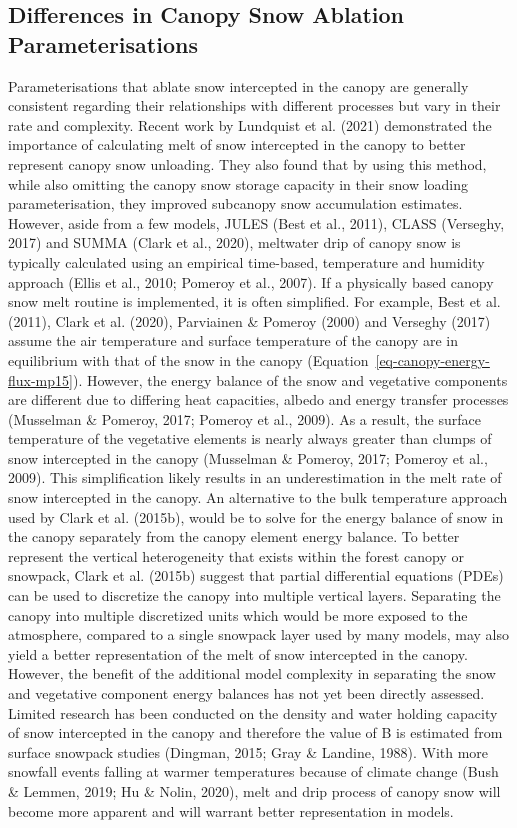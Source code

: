 \documentclass[
  letterpaper,
]{tex/uofsthesis-cs}
\begin{document}
\subsection{Differences in Canopy Snow Ablation
Parameterisations}\label{differences-in-canopy-snow-ablation-parameterisations}

Parameterisations that ablate snow intercepted in the canopy are
generally consistent regarding their relationships with different
processes but vary in their rate and complexity. Recent work by
Lundquist et al. (2021) demonstrated the importance of calculating melt
of snow intercepted in the canopy to better represent canopy snow
unloading. They also found that by using this method, while also
omitting the canopy snow storage capacity in their snow loading
parameterisation, they improved subcanopy snow accumulation estimates.
However, aside from a few models, JULES (Best et al., 2011), CLASS
(Verseghy, 2017) and SUMMA (Clark et al., 2020), meltwater drip of
canopy snow is typically calculated using an empirical time-based,
temperature and humidity approach (Ellis et al., 2010; Pomeroy et al.,
2007). If a physically based canopy snow melt routine is implemented, it
is often simplified. For example, Best et al. (2011), Clark et al.
(2020), Parviainen \& Pomeroy (2000) and Verseghy (2017) assume the air
temperature and surface temperature of the canopy are in equilibrium
with that of the snow in the canopy
(Equation~\ref{eq-canopy-energy-flux-mp15}). However, the energy balance
of the snow and vegetative components are different due to differing
heat capacities, albedo and energy transfer processes (Musselman \&
Pomeroy, 2017; Pomeroy et al., 2009). As a result, the surface
temperature of the vegetative elements is nearly always greater than
clumps of snow intercepted in the canopy (Musselman \& Pomeroy, 2017;
Pomeroy et al., 2009). This simplification likely results in an
underestimation in the melt rate of snow intercepted in the canopy. An
alternative to the bulk temperature approach used by Clark et al.
(2015b), would be to solve for the energy balance of snow in the canopy
separately from the canopy element energy balance. To better represent
the vertical heterogeneity that exists within the forest canopy or
snowpack, Clark et al. (2015b) suggest that partial differential
equations (PDEs) can be used to discretize the canopy into multiple
vertical layers. Separating the canopy into multiple discretized units
which would be more exposed to the atmosphere, compared to a single
snowpack layer used by many models, may also yield a better
representation of the melt of snow intercepted in the canopy. However,
the benefit of the additional model complexity in separating the snow
and vegetative component energy balances has not yet been directly
assessed. Limited research has been conducted on the density and water
holding capacity of snow intercepted in the canopy and therefore the
value of B is estimated from surface snowpack studies (Dingman, 2015;
Gray \& Landine, 1988). With more snowfall events falling at warmer
temperatures because of climate change (Bush \& Lemmen, 2019; Hu \&
Nolin, 2020), melt and drip process of canopy snow will become more
apparent and will warrant better representation in models.
\end{document}
